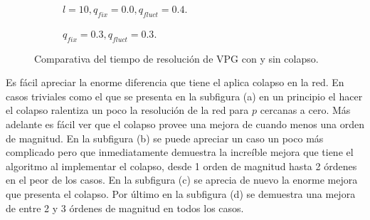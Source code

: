\begin{figure}
	\begin{subfigure}{0.45\textwidth}
  \caption{$l = 10, q_{fix}=0.0, q_{fluct}=0.4$.}
  \end{subfigure}
  \hfill
  \begin{subfigure}{0.45\textwidth}
  \caption{$q_{fix}=0.3, q_{fluct}=0.3$.}
  \end{subfigure}
  \caption{Comparativa del tiempo de resolución de VPG con y sin colapso.}
  \label{fig:con-sin-colapso}
\end{figure}

Es fácil apreciar la enorme diferencia que tiene el aplica colapso en la red. En casos triviales como el que se presenta en la subfigura (a) en un principio el hacer el colapso ralentiza un poco la resolución de la red para $p$ cercanas a cero.  Más adelante es fácil ver que el colapso provee una mejora de cuando menos una orden de magnitud. En la subfigura (b) se puede apreciar un caso un poco más complicado  pero que inmediatamente demuestra la increíble mejora que tiene el algoritmo al implementar el colapso, desde 1 orden de magnitud hasta 2 órdenes en el peor de los casos. En la subfigura (c) se aprecia de nuevo la enorme mejora que presenta el colapso. Por último en la subfigura (d) se demuestra una mejora de entre 2 y 3 órdenes de magnitud en todos los casos.

